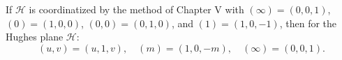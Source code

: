 If $\mathcal{H}$ is coordinatized by the method of Chapter V with $(\infty) = (0,0,1)$, $(0) = (1,0,0)$, $(0,0) = (0,1,0)$, and $(1) = (1,0,-1)$, then for the Hughes plane $\mathcal{H}$:
$$(u, v) = (u, 1, v), \quad (m) = (1, 0, -m), \quad (\infty) = (0, 0, 1).$$
